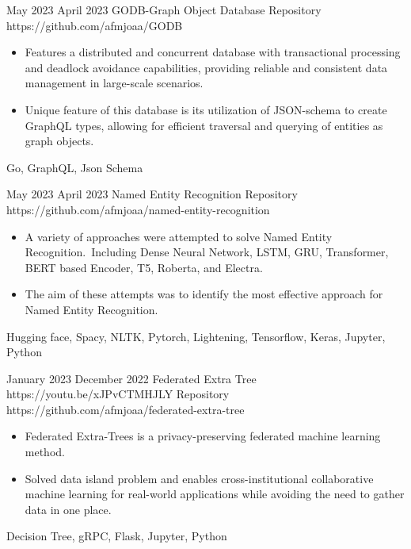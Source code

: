 
\horizontalLine
\begin{universalList}
  \universalListItemWithoutLink
    {May 2023}
    {April 2023}
    {GODB-Graph Object Database}
    {Repository}
    {https://github.com/afmjoaa/GODB}
    {
      \begin{itemize}
        \item  Features a distributed and concurrent database with transactional processing and deadlock avoidance capabilities, providing reliable and consistent data management in large-scale scenarios.
        \item Unique feature of this  database is its utilization of JSON-schema to create GraphQL types, allowing for efficient traversal and querying of entities as graph objects.
      \end{itemize}
    }
    {Go, GraphQL, Json Schema}

  \emptySeparator
  \universalListItemWithoutLink
    {May 2023}
    {April 2023}
    {Named Entity Recognition}
    {Repository}
    {https://github.com/afmjoaa/named-entity-recognition}
    {
      \begin{itemize}
        \item A variety of approaches were attempted to solve Named Entity Recognition.\ Including Dense Neural Network, LSTM, GRU, Transformer, BERT based Encoder, T5, Roberta, and Electra.
        \item The aim of these attempts was to identify the most effective approach for Named Entity Recognition.
      \end{itemize}
    }
    {Hugging face, Spacy, NLTK, Pytorch, Lightening, Tensorflow, Keras, Jupyter, Python}

  \emptySeparator
  \universalListItem
    {January 2023}
    {December 2022}
    {Federated Extra Tree}
    {https://youtu.be/xJPvCTMHJLY}
    {Repository}
    {https://github.com/afmjoaa/federated-extra-tree}
    {
      \begin{itemize}
        \item Federated Extra-Trees is a privacy-preserving federated machine learning method.
        \item Solved data island problem and enables cross-institutional collaborative machine learning for real-world applications while avoiding the need to gather data in one place.
      \end{itemize}
    }
    {Decision Tree, gRPC, Flask, Jupyter, Python}


\end{universalList}
